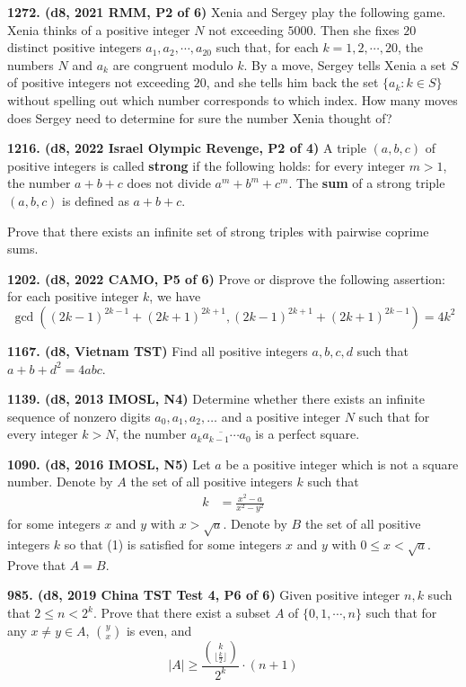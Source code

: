 \documentclass{article}
\begin{document}
\textbf{1272. (\color{red}d8\color{black}, 2021 RMM, P2 of 6)} Xenia and Sergey play the following game. Xenia thinks of a positive integer $N$ not exceeding $5000$. Then she fixes $20$ distinct positive integers $a_1, a_2, \cdots, a_{20}$ such that, for each $k = 1,2,\cdots,20$, the numbers $N$ and $a_k$ are congruent modulo $k$. By a move, Sergey tells Xenia a set $S$ of positive integers not exceeding $20$, and she tells him back the set $\{a_k : k \in S\}$ without spelling out which number corresponds to which index. How many moves does Sergey need to determine for sure the number Xenia thought of?

\textbf{1216. (\color{red}d8\color{black}, 2022 Israel Olympic Revenge, P2 of 4)} A triple $(a,b,c)$ of positive integers is called \textbf{strong} if the following holds: for every integer $m>1$, the number $a+b+c$ does not divide $a^m+b^m+c^m$. The \textbf{sum} of a strong triple $(a,b,c)$ is defined as $a+b+c$.

Prove that there exists an infinite set of strong triples with pairwise coprime sums.

\textbf{1202. (\color{red}d8\color{black}, 2022 CAMO, P5 of 6)} Prove or disprove the following assertion: for each positive integer $k$, we have \[\gcd\left((2k-1)^{2k-1}+(2k+1)^{2k+1},(2k-1)^{2k+1}+(2k+1)^{2k-1}\right)=4k^2\]

\textbf{1167. (\color{red}d8\color{black}, Vietnam TST)} Find all positive integers $a,b,c,d$ such that $a+b+d^2=4abc$.

\textbf{1139. (\color{red}d8\color{black}, 2013 IMOSL, N4)} Determine whether there exists an infinite sequence of nonzero digits $a_0, a_1, a_2, \dots $ and a positive integer $N$ such that for every integer $k>N$, the number $\overline{a_ka_{k-1}\cdots a_0}$ is a perfect square.

\textbf{1090. (\color{red}d8\color{black}, 2016 IMOSL, N5)} Let $a$ be a positive integer which is not a square number. Denote by $A$ the set of all positive integers $k$ such that
\begin{align} k&=\frac{x^2-a}{x^2-y^2}\end{align}
for some integers $x$ and $y$ with $x>\sqrt{a}$. Denote by $B$ the set of all positive integers $k$ so that (1) is satisfied for some integers $x$ and $y$ with $0\leq x<\sqrt{a}$. Prove that $A=B$.

\textbf{985. (\color{red}d8\color{black}, 2019 China TST Test 4, P6 of 6)} Given positive integer $n,k$ such that $2 \le n <2^k$. Prove that there exist a subset $A$ of $\{0,1,\cdots,n\}$ such that for any $x \neq y \in A$, ${y\choose x}$ is even, and$$|A| \ge \frac{{k\choose \lfloor \frac{k}{2} \rfloor}}{2^k} \cdot (n+1)$$
\end{document}
